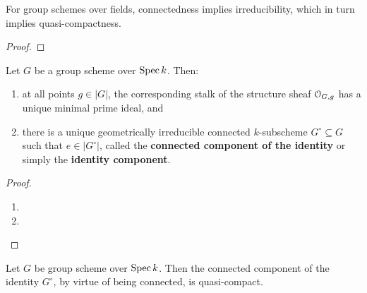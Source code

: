         \begin{lemma} \label{lemma: irreducibility_quasi_compactness_connectedness_of_group_schemes_over_fields}
            For group schemes over fields, connectedness implies irreducibility, which in turn implies quasi-compactness. 
        \end{lemma}
            \begin{proof}
                
            \end{proof} 
        \begin{proposition} \label{prop: existence_of_identity_components_of_group_schemes_over_fields}
            Let $G$ be a group scheme over $\operatorname{Spec} k$. Then:
                \begin{enumerate}
                    \item at all points $g \in |G|$, the corresponding stalk of the structure sheaf $\mathcal{O}_{G, g}$ has a unique minimal prime ideal, and
                    \item there is a unique geometrically irreducible connected $k$-subscheme $G^{\circ} \subseteq G$ such that $e \in |G^{\circ}|$, called the \textbf{connected component of the identity} or simply the \textbf{identity component}.
                \end{enumerate}
        \end{proposition}
            \begin{proof}
                \noindent
                \begin{enumerate}
                    \item 
                    \item 
                \end{enumerate}
            \end{proof}
        \begin{corollary}
            Let $G$ be group scheme over $\operatorname{Spec} k$. Then the connected component of the identity $G^{\circ}$, by virtue of being connected, is quasi-compact. 
        \end{corollary}
            
